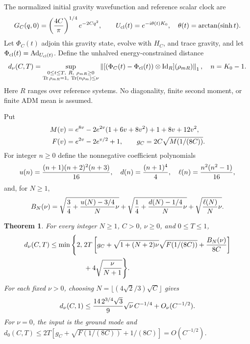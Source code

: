 \documentclass[11pt]{article}
\newtheorem{theorem}{Theorem}
\newcommand{\tr}{\operatorname{Tr}}
\newcommand{\norm}[1]{\left\lVert#1\right\rVert}
\begin{document}
The normalized initial gravity wavefunction and reference scalar clock are
\begin{equation}
 G_C(q,0)=\left({4C\over\pi}\right)^{1/4}e^{-2Cq^2},\qquad
 U_{\rm cl}(t)=e^{-i\theta(t)K_0},\quad\theta(t)=\arctan(\sinh t).
 \label{eq:initial}
\end{equation}
Let $\Phi_C(t)$ adjoin this gravity state, evolve with $H_C$, and trace
gravity, and let $\Phi_{\rm cl}(t)=\operatorname{Ad}_{U_{\rm cl}(t)}$.
Define the unhalved energy-constrained distance
\begin{equation}
 d_\nu(C,T)=\sup_{\substack{0\le t\le T,\ R,\ \rho_{mR}\ge0\\
 \tr\rho_{mR}=1,\ \tr(n\rho_m)\le\nu}}
 \norm{[(\Phi_C(t)-\Phi_{\rm cl}(t))\otimes\operatorname{Id}_R]
 (\rho_{mR})}_1,\quad n=K_0-1. \label{eq:distance}
\end{equation}
Here $R$ ranges over reference systems. No diagonality, finite second
moment, or finite ADM mean is assumed.

Put
\begin{align}
 M(v)&=e^{8v}-2e^{2v}(1+6v+8v^2)+1+8v+12v^2,\notag\\
 F(v)&=e^{2v}-2e^{v/2}+1,\qquad g_C=2C\sqrt{M(1/(8C))}.\label{eq:MF}
\end{align}
For integer $n\ge0$ define the nonnegative coefficient polynomials
\begin{equation}
 u(n)={(n+1)(n+2)^2(n+3)\over16},\quad
 d(n)={(n+1)^4\over4},\quad
 \ell(n)={n^2(n^2-1)\over16},\label{eq:polynomials}
\end{equation}
and, for $N\ge1$,
\begin{equation}
 B_N(\nu)=\sqrt{{3\over4}+{u(N)-3/4\over N}\nu}
 +\sqrt{{1\over4}+{d(N)-1/4\over N}\nu}
 +\sqrt{{\ell(N)\over N}\nu}.\label{eq:B}
\end{equation}

\begin{theorem}\label{thm:main}
For every integer $N\ge1$, $C>0$, $\nu\ge0$, and $0\le T\le1$,
\begin{align}
 d_\nu(C,T)\le\min\Bigg\{2,\;&
 2T\left[g_C+\sqrt{1+(N+2)\nu}\sqrt{F(1/(8C))}
             +{B_N(\nu)\over8C}\right]\notag\\
 &+4\sqrt{{\nu\over N+1}}\Bigg\}.\label{eq:finite}
\end{align}
For each fixed $\nu>0$, choosing
$N=\lfloor(4\sqrt2/3)\sqrt C\rfloor$ gives
\begin{equation}
 d_\nu(C,1)\le {14\,2^{3/4}\sqrt3\over9}\sqrt\nu\,C^{-1/4}
                    +O_\nu(C^{-1/2}).\label{eq:rate}
\end{equation}
For $\nu=0$, the input is the ground mode and
$d_0(C,T)\le2T[g_C+\sqrt{F(1/(8C))}+1/(8C)]=O(C^{-1/2})$.
\end{theorem}
\end{document}
